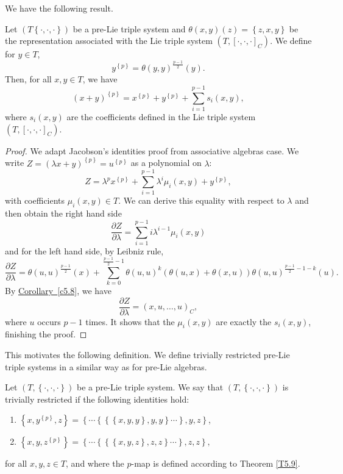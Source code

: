 \documentclass[11pt, twoside]{article}
\begin{document}
We have the following result.

\begin{thm}\label{T5.9}
    Let $(T\left\{ \cdot,\cdot,\cdot\right\})$ be a pre-Lie triple system and $\theta(x,y)(z)= \left\{ z,x,y\right\} $ be the representation associated with the Lie triple system $(T,[\cdot,\cdot,\cdot]_C) $. We define for $y\in T$, $$y^{\left\{p\right\}}= \theta(y,y)^{\frac{p-1}{2}}(y).  $$ Then, for all $x,y\in T$, we have $$(x+y)^{\left\{p\right\}}= x^{\left\{p\right\}} + y^{\left\{p\right\}} + \sum\limits_{i=1}^{p-1}s_i(x,y), $$ where $s_i(x,y)$ are the coefficients defined in the Lie triple system $(T,[\cdot,\cdot,\cdot]_C) $.
\end{thm}

\begin{proof}
    We adapt  Jacobson's identities proof from  associative algebras case. We write $Z = (\lambda x+y)^{\left\{p\right\}}= u^{\left\{p\right\}} $ as a polynomial on $\lambda $: $$Z = \lambda^p x^{\left\{p\right\}} + \sum\limits_{i=1}^{p-1}\lambda^i\mu_i(x,y)+ y^{\left\{p\right\}}, $$ with coefficients $\mu_i(x,y)\in T $. We can derive this equality with respect to $\lambda$ and then obtain the right hand side $$\frac{\partial Z}{\partial \lambda}= \sum\limits_{i=1}^{p-1}i \lambda^{i-1}\mu_i(x,y) $$ and for the left hand side, by Leibniz rule, $$\frac{\partial Z}{\partial \lambda}= \theta(u,u)^{\frac{p-1}{2}}(x)+ \sum\limits_{k=0}^{\frac{p-1}{2}-1}\theta(u,u)^k(\theta(u,x)+\theta(x,u))\theta(u,u)^{\frac{p-1}{2}-1-k}(u). $$ By \hyperref[c5.8]{Corollary~\ref*{c5.8}}, we have $$\frac{\partial Z}{\partial \lambda}= (x,u,\ldots,u)_C,$$ where $u$ occurs $p-1$ times. It shows that the $\mu_i(x,y) $ are exactly the $s_i(x,y)$, finishing  the proof.
\end{proof}

This motivates the following definition. We  define trivially restricted pre-Lie triple systems in a similar way as for pre-Lie algebras.

\begin{defi}
    Let $(T,\left\{ \cdot,\cdot,\cdot\right\}) $ be a pre-Lie triple system. We say that $(T,\left\{ \cdot,\cdot,\cdot\right\}) $ is trivially restricted if the following identities hold: \begin{enumerate}
        \item $\left\{ x,y^{\left\{p\right\}},z\right\}=\left\{\cdots \left\{\left\{\left\{ x,y,y\right\},y,y \right\}\cdots\right\},y,z\right\} $,
        \item $\left\{ x,y,z^{\left\{p\right\}} \right\}=\left\{\cdots \left\{\left\{\left\{ x,y,z\right\},z,z \right\}\cdots\right\},z,z\right\}, $
    \end{enumerate} for all $x,y,z\in T$, and where the $p$-map is defined according to Theorem \ref{T5.9}.
\end{defi}
\end{document}
